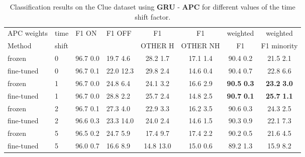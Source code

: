\documentclass{article}
\begin{document}
\begin{table}[h]
\caption{
Classification results on the Clue dataset using \textbf{GRU} - \textbf{APC} for different values of the time shift factor.}
\label{tab:results_clue_APC_GRU}
\vskip 0.1in
\begin{center}
\begin{small}
\begin{sc}
\begin{tabular}{llllcccc}
\toprule
{APC weights} & {time} &  {F1 ON} & {F1 OFF} & {F1} & {F1} & {weighted} & {weighted}\\
{Method} & {shift} &  &  & {OTHER H} & {OTHER NH} & {F1} & {F1 minority}\\
\midrule
{frozen} & 0 & 96.7  0.0 & 19.7   4.6 &  28.2  1.7 & 17.1  1.4 & 90.4  0.2 & 21.5  2.1 \\
\hline
{fine-tuned} &  0 & 96.7  0.1 & 22.0  12.3 & 29.8  2.4 & 14.6  0.4 & 90.4  0.7 & 22.8  6.6 \\
\hline
{frozen} & 1 & 96.7  0.0 & 24.8  6.4 &  24.1  3.2 & 16.6  2.9 & \textbf{90.5}  \textbf{0.3} & \textbf{23.2}  \textbf{3.0}\\
\hline
{fine-tuned} &  1 & 96.7  0.0 & 28.8  2.2 & 25.7  2.4 & 14.8  2.5 & \textbf{90.7}  \textbf{0.1} & \textbf{25.7}  \textbf{1.1} \\
\hline
{frozen} &  2 & 96.7  0.1 & 27.3  4.0 &  22.9  3.3 & 16.2  3.5 & 90.6  0.3 & 24.3  2.5 \\
\hline
{fine-tuned} &  2 & 96.6  0.3 & 23.3  14.0 &  24.0  2.4 & 14.6  1.5 & 90.3  0.9 & 22.1  7.3\\
\hline
{frozen} &  5 & 96.5  0.2 & 24.7  5.9 & 17.4  9.7 & 17.4  2.2 & 90.2  0.5 & 21.6  4.5 \\
\hline
{fine-tuned} &  5 & 96.0  0.7 & 16.6  8.9 & 14.8  13.0 & 15.0  0.6 & 89.2  1.3 & 15.9  8.2\\
\bottomrule
\end{tabular}
\end{sc}
\end{small}
\end{center}
\vskip -0.15in
\end{table}
\end{document}
